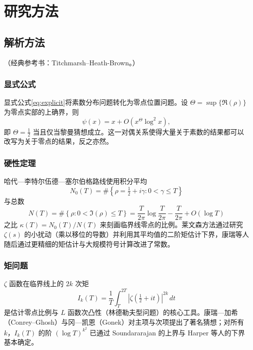 \section{研究方法}\label{sec:methods}

\subsection{解析方法}

（经典参考书：Titchmarsh--Heath-Brown\cite{titchmarsh1986theory}。）

\subsubsection{显式公式}

显式公式\cref{eq:explicit}将素数分布问题转化为零点位置问题。设 $\Theta = \sup\{\Re(\rho)\}$ 为零点实部的上确界，则
\begin{equation}
    \psi(x) = x + O\!\left(x^{\Theta} \log^2 x\right),
\end{equation}
即 $\Theta = \tfrac{1}{2}$ 当且仅当黎曼猜想成立。这一对偶关系使得大量关于素数的结果都可以改写为关于零点的结果，反之亦然。

\subsubsection{硬性定理}

哈代—李特尔伍德—塞尔伯格路线使用积分平均
\begin{equation}
    N_0(T) = \#\left\{\rho = \tfrac{1}{2} + i\gamma : 0 < \gamma \le T\right\}
\end{equation}
与总数
\begin{equation}
    N(T) = \#\left\{\rho : 0 < \Im(\rho) \le T\right\} = \frac{T}{2\pi}\log\frac{T}{2\pi} - \frac{T}{2\pi} + O(\log T)
\end{equation}
之比 $\kappa(T) = N_0(T)/N(T)$ 来刻画临界线零点的比例。莱文森方法\cite{levinson1974zeros}通过研究 $\zeta(s)$ 的小扰动（乘以移位的导数）并利用其平均值的二阶矩估计下界，康瑞等人随后通过更精细的矩估计与大规模符号计算改进了常数\cite{conrey1989zeros,pratt2024zeros}。

\subsubsection{矩问题}

$\zeta$ 函数在临界线上的 $2k$ 次矩
\begin{equation}
    I_k(T) = \frac{1}{T}\int_{T}^{2T} |\zeta(\tfrac{1}{2}+it)|^{2k}\, dt
\end{equation}
是估计零点比例与 $L$ 函数次凸性（林德勒夫型问题）的核心工具。康瑞—加希（Conrey--Ghosh）与冈—凯恩（Gonek）对主项与次项提出了著名猜想；对所有 $k$，$I_k(T)$ 的阶 $(\log T)^{k^2}$ 已通过 Soundararajan 的上界与 Harper 等人的下界基本确定。

